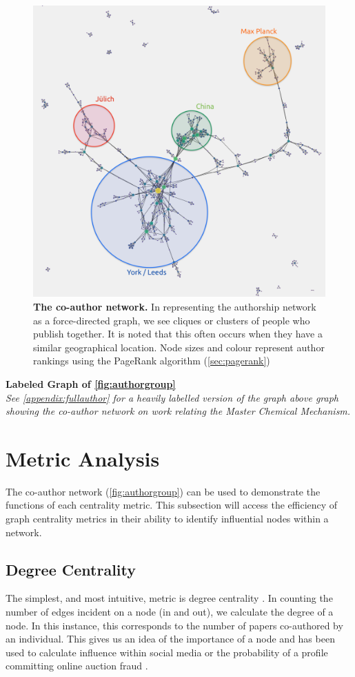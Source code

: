 \begin{figure}[H]
     \centering
         \includegraphics[width=.8\textwidth]{figures_c3/GroupAuthor.png}
        \caption{ \textbf{The co-author network.} In representing the authorship network as a force-directed graph, we see cliques or clusters of people who publish together. It is noted that this often occurs when they have a similar geographical location. Node sizes and colour represent author rankings using the PageRank algorithm (\autoref{sec:pagerank})}
        \label{fig:authorgroup}
\end{figure}


\textbf{Labeled Graph of \autoref{fig:authorgroup}}\\
\textit{See \autoref{appendix:fullauthor} for a heavily labelled version of the graph above graph showing the co-author network on work relating the Master Chemical Mechanism. }


\section{Metric Analysis}\label{sec:graphcentrality}

The co-author network (\autoref{fig:authorgroup}) can be used to demonstrate the functions of each centrality metric. This subsection will access the efficiency of graph centrality metrics in their ability to identify influential nodes within a network.

\newpage

\subsection{Degree Centrality}
The simplest, and most intuitive, metric is degree centrality \citep{degreefreeman}.  In counting the number of edges incident on a node (in and out), we calculate the degree of a node. In this instance, this corresponds to the number of papers co-authored by an individual. This gives us an idea of the importance of a node and has been used to calculate influence within social media or the probability of a profile committing online auction fraud \citep{degreetwitter,degreefreeman}.


